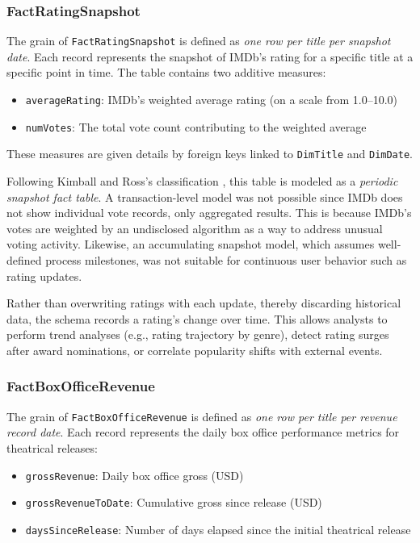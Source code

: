 \subsubsection{FactRatingSnapshot}

The grain of \texttt{FactRatingSnapshot} is defined as \textit{one row per title per snapshot date}. Each record represents the snapshot of IMDb's rating for a specific title at a specific point in time. The table contains two additive measures:

\begin{itemize}
    \item \texttt{averageRating}: IMDb's weighted average rating (on a scale from 1.0–10.0)
    \item \texttt{numVotes}: The total vote count contributing to the weighted average
\end{itemize}

These measures are given details by foreign keys linked to \texttt{DimTitle} and \texttt{DimDate}.

Following Kimball and Ross's classification \cite{kimball2013datawarehouse}, this table is modeled as a \textit{periodic snapshot fact table}. A transaction-level model was not possible since IMDb does not show individual vote records, only aggregated results. This is because IMDb's votes are weighted by an undisclosed algorithm as a way to address unusual voting activity. Likewise, an accumulating snapshot model, which assumes well-defined process milestones, was not suitable for continuous user behavior such as rating updates.

Rather than overwriting ratings with each update, thereby discarding historical data, the schema records a rating's change over time. This allows analysts to perform trend analyses (e.g., rating trajectory by genre), detect rating surges after award nominations, or correlate popularity shifts with external events.

\subsubsection{FactBoxOfficeRevenue}

The grain of \texttt{FactBoxOfficeRevenue} is defined as \textit{one row per title per revenue record date}. Each record represents the daily box office performance metrics for theatrical releases:

\begin{itemize}
    \item \texttt{grossRevenue}: Daily box office gross (USD)
    \item \texttt{grossRevenueToDate}: Cumulative gross since release (USD)
    \item \texttt{daysSinceRelease}: Number of days elapsed since the initial theatrical release
\end{itemize}

